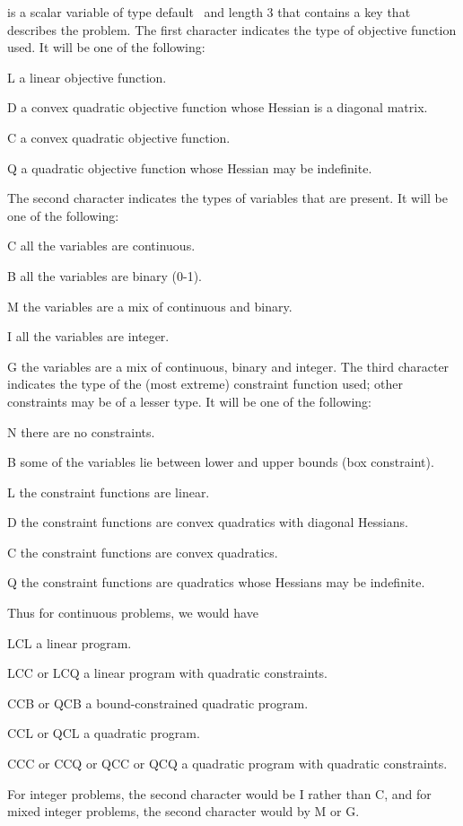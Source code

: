 \documentclass{galahad}
\begin{document}
\begin{description}
 is a scalar variable of type default \character\
and length 3 that contains a key that describes the problem.
The first character indicates the type of objective function used.
It will be one of the following:
\begin{description}
      \item L a linear objective function.
      \item D a convex quadratic objective function whose Hessian is a
              diagonal matrix.
      \item C a convex quadratic objective function.
      \item Q a quadratic objective function whose Hessian may be indefinite.
\end{description}
The second character indicates the types of variables that are present.
     It will be one of the following:
\begin{description}
      \item C  all the variables are continuous.
      \item B  all the variables are binary (0-1).
      \item M  the variables are a mix of continuous and binary.
      \item I  all the variables are integer.
      \item G  the variables are a mix of continuous, binary and integer.
   \n
The third character indicates the type of the (most extreme)
     constraint function used; other constraints may be of a lesser type.
     It will be one of the following:
\begin{description}
       \item N  there are no constraints.
       \item B  some of the variables lie between lower and upper bounds
              (box constraint).
       \item L  the constraint functions are linear.
       \item D  the constraint functions are convex quadratics with diagonal
              Hessians.
       \item C  the constraint functions are convex quadratics.
       \item Q  the constraint functions are quadratics whose Hessians
              may be indefinite.
\end{description}
     Thus for continuous problems, we would have
\begin{description}
       \item LCL            a linear program.
       \item LCC or LCQ     a linear program with quadratic constraints.
       \item CCB or QCB     a bound-constrained quadratic program.
       \item CCL or QCL     a quadratic program.
       \item CCC or CCQ or QCC or QCQ a quadratic program with quadratic
                          constraints.
\end{description}
     For integer problems, the second character would be I rather than C,
     and for mixed integer problems, the second character would by M or G.


\end{description}
\end{description}
\end{document}
